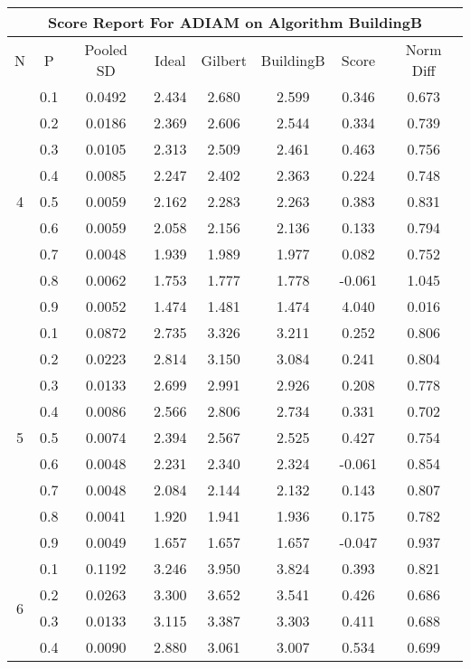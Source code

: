 \documentclass[11pt,a4paper]{report}
\begin{document}
\begin{longtable}{ | c | c || c | c | c | c | c | c | }
\hline
\multicolumn{8}{|c|}{ Score Report For ADIAM on Algorithm BuildingB} \\
\hline
N & P & Pooled SD &  Ideal &  Gilbert & BuildingB  & Score & Norm Diff \\
 \hline
 \hline
 \endhead
\multirow{9}{*}{4} & 0.1 & 0.0492 & 2.434 & 2.680 & 2.599 & 0.346 & 0.673 \\
 & 0.2 & 0.0186 & 2.369 & 2.606 & 2.544 & 0.334 & 0.739 \\
 & 0.3 & 0.0105 & 2.313 & 2.509 & 2.461 & 0.463 & 0.756 \\
 & 0.4 & 0.0085 & 2.247 & 2.402 & 2.363 & 0.224 & 0.748 \\
 & 0.5 & 0.0059 & 2.162 & 2.283 & 2.263 & 0.383 & 0.831 \\
 & 0.6 & 0.0059 & 2.058 & 2.156 & 2.136 & 0.133 & 0.794 \\
 & 0.7 & 0.0048 & 1.939 & 1.989 & 1.977 & 0.082 & 0.752 \\
 & 0.8 & 0.0062 & 1.753 & 1.777 & 1.778 & -0.061 & 1.045 \\
 & 0.9 & 0.0052 & 1.474 & 1.481 & 1.474 & 4.040 & 0.016 \\
 \hline
\multirow{9}{*}{5} & 0.1 & 0.0872 & 2.735 & 3.326 & 3.211 & 0.252 & 0.806 \\
 & 0.2 & 0.0223 & 2.814 & 3.150 & 3.084 & 0.241 & 0.804 \\
 & 0.3 & 0.0133 & 2.699 & 2.991 & 2.926 & 0.208 & 0.778 \\
 & 0.4 & 0.0086 & 2.566 & 2.806 & 2.734 & 0.331 & 0.702 \\
 & 0.5 & 0.0074 & 2.394 & 2.567 & 2.525 & 0.427 & 0.754 \\
 & 0.6 & 0.0048 & 2.231 & 2.340 & 2.324 & -0.061 & 0.854 \\
 & 0.7 & 0.0048 & 2.084 & 2.144 & 2.132 & 0.143 & 0.807 \\
 & 0.8 & 0.0041 & 1.920 & 1.941 & 1.936 & 0.175 & 0.782 \\
 & 0.9 & 0.0049 & 1.657 & 1.657 & 1.657 & -0.047 & 0.937 \\
 \hline
\multirow{9}{*}{6} & 0.1 & 0.1192 & 3.246 & 3.950 & 3.824 & 0.393 & 0.821 \\
 & 0.2 & 0.0263 & 3.300 & 3.652 & 3.541 & 0.426 & 0.686 \\
 & 0.3 & 0.0133 & 3.115 & 3.387 & 3.303 & 0.411 & 0.688 \\
 & 0.4 & 0.0090 & 2.880 & 3.061 & 3.007 & 0.534 & 0.699 \\

\end{longtable}
\end{document}

